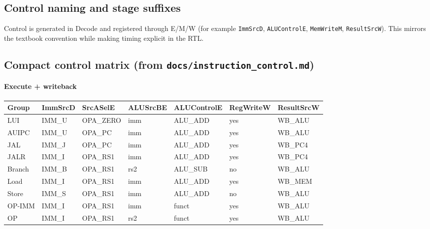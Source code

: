 \subsection{Control naming and stage suffixes}
Control is generated in Decode and registered through E/M/W (for example
\texttt{ImmSrcD}, \texttt{ALUControlE}, \texttt{MemWriteM}, \texttt{ResultSrcW}).
This mirrors the textbook convention while making timing explicit in the RTL.

\subsection{Compact control matrix (from \texttt{docs/instruction\_control.md})}

\paragraph{Execute + writeback}
\begin{center}
\small
\begin{tabular}{@{}l l l l l l l@{}}
\toprule
Group & ImmSrcD & SrcASelE & ALUSrcBE & ALUControlE & RegWriteW & ResultSrcW \\
\midrule
LUI    & IMM\_U & OPA\_ZERO & imm & ALU\_ADD & yes & WB\_ALU \\
AUIPC  & IMM\_U & OPA\_PC   & imm & ALU\_ADD & yes & WB\_ALU \\
JAL    & IMM\_J & OPA\_PC   & imm & ALU\_ADD & yes & WB\_PC4 \\
JALR   & IMM\_I & OPA\_RS1  & imm & ALU\_ADD & yes & WB\_PC4 \\
Branch & IMM\_B & OPA\_RS1  & rs2 & ALU\_SUB & no  & WB\_ALU \\
Load   & IMM\_I & OPA\_RS1  & imm & ALU\_ADD & yes & WB\_MEM \\
Store  & IMM\_S & OPA\_RS1  & imm & ALU\_ADD & no  & WB\_ALU \\
OP-IMM & IMM\_I & OPA\_RS1  & imm & funct   & yes & WB\_ALU \\
OP     & IMM\_I & OPA\_RS1  & rs2 & funct   & yes & WB\_ALU \\
\bottomrule
\end{tabular}
\end{center}
\normalsize

